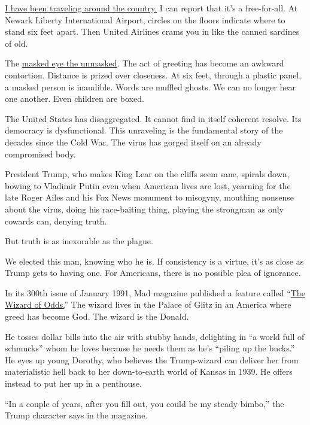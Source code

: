 \href{https://www.nytimes3xbfgragh.onion/2020/06/26/opinion/let-freedom-ring-from-georgia.html}{I
have been traveling around the country.} I can report that it's a
free-for-all. At Newark Liberty International Airport, circles on the
floors indicate where to stand six feet apart. Then United Airlines
crams you in like the canned sardines of old.

The
\href{https://www.nytimes3xbfgragh.onion/2020/06/30/style/mask-america-freedom-coronavirus.html}{masked
eye the unmasked}. The act of greeting has become an awkward contortion.
Distance is prized over closeness. At six feet, through a plastic panel,
a masked person is inaudible. Words are muffled ghosts. We can no longer
hear one another. Even children are boxed.

The United States has disaggregated. It cannot find in itself coherent
resolve. Its democracy is dysfunctional. This unraveling is the
fundamental story of the decades since the Cold War. The virus has
gorged itself on an already compromised body.

President Trump, who makes King Lear on the cliffs seem sane, spirals
down, bowing to Vladimir Putin even when American lives are lost,
yearning for the late Roger Ailes and his Fox News monument to misogyny,
mouthing nonsense about the virus, doing his race-baiting thing, playing
the strongman as only cowards can, denying truth.

But truth is as inexorable as the plague.

We elected this man, knowing who he is. If consistency is a virtue, it's
as close as Trump gets to having one. For Americans, there is no
possible plea of ignorance.

In its 300th issue of January 1991, Mad magazine published a feature
called
``\href{https://www.comicartfans.com/gallerypiece.asp?piece=1306080}{The
Wizard of Odds.}'' The wizard lives in the Palace of Glitz in an America
where greed has become God. The wizard is the Donald.

He tosses dollar bills into the air with stubby hands, delighting in ``a
world full of schmucks'' whom he loves because he needs them as he's
``piling up the bucks.'' He eyes up young Dorothy, who believes the
Trump-wizard can deliver her from materialistic hell back to her
down-to-earth world of Kansas in 1939. He offers instead to put her up
in a penthouse.

``In a couple of years, after you fill out, you could be my steady
bimbo,'' the Trump character says in the magazine.

